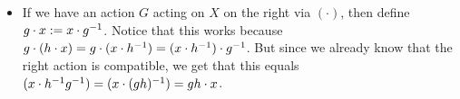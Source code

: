\documentclass[12pt, twosided]{article}
\begin{document}
\begin{enumerate}
\begin{itemize}
\begin{proof}
      Now we check that this is actually a homomorphism:
      \begin{align*}
        \iota(g \circ h) &= (g \circ h)\1 \\
                         &= h\1 \circ g\1 \\
                         &= g\1 \times h\1 \\
                         &= \iota(g) \times \iota(h)
      \end{align*}
      So we have an isomorphism.
    \end{proof}
  \item If we have an action \(G\) acting on \(X\) on the right via \((\cdot)\), then define \(g \cdot x := x \cdot g^{-1}\). Notice that this works because \(g \cdot (h \cdot x) = g \cdot (x \cdot h^{-1}) = (x \cdot h^{-1}) \cdot g^{-1}\). But since we already know that the right action is compatible, we get that this equals \((x \cdot h^{-1}g^{-1}) = (x\cdot (gh)^{-1}) = gh \cdot x\).
  \end{itemize}
\end{enumerate}
\end{document}
